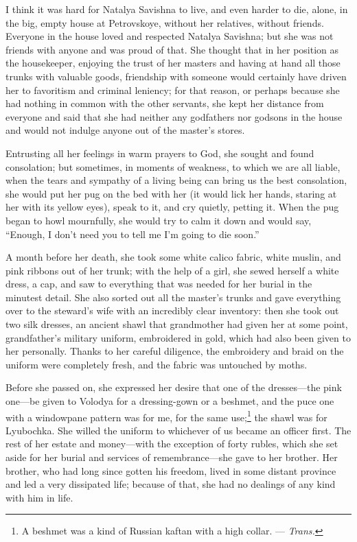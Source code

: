 I think it was hard for Natalya Savishna to live, and even harder to die, alone, in the big, empty house at Petrovskoye, without her relatives, without friends. Everyone in the house loved and respected Natalya Savishna; but she was not friends with anyone and was proud of that. She thought that in her position as the housekeeper, enjoying the trust of her masters and having at hand all those trunks with valuable goods, friendship with someone would certainly have driven her to favoritism and criminal leniency; for that reason, or perhaps because she had nothing in common with the other servants, she kept her distance from everyone and said that she had neither any godfathers nor godsons in the house and would not indulge anyone out of the master's stores.

Entrusting all her feelings in warm prayers to God, she sought and found consolation; but sometimes, in moments of weakness, to which we are all liable, when the tears and sympathy of a living being can bring us the best consolation, she would put her pug on the bed with her (it would lick her hands, staring at her with its yellow eyes), speak to it, and cry quietly, petting it. When the pug began to howl mournfully, she would try to calm it down and would say, ``Enough, I don't need you to tell me I'm going to die soon.'' %

A month before her death, she took some white calico fabric, white muslin, and pink ribbons out of her trunk; with the help of a girl, she sewed herself a white dress, a cap, and saw to everything that was needed for her burial in the minutest detail. She also sorted out all the master's trunks and gave everything over to the steward's wife with an incredibly clear inventory: then she took out two silk dresses, an ancient shawl that grandmother had given her at some point, grandfather's military uniform, embroidered in gold, which had also been given to her personally. Thanks to her careful diligence, the embroidery and braid on the uniform were completely fresh, and the fabric was untouched by moths.

Before she passed on, she expressed her desire that one of the dresses---the pink one---be given to Volodya for a dressing-gown or a beshmet, and the puce one with a windowpane pattern was for me, for the same use;\footnote{A beshmet was a kind of Russian kaftan with a high collar. --- \textit{Trans.}} the shawl was for Lyubochka. She willed the uniform to whichever of us became an officer first. The rest of her estate and money---with the exception of forty rubles, which she set aside for her burial and services of remembrance---she gave to her brother. Her brother, who had long since gotten his freedom, lived in some distant province and led a very dissipated life; because of that, she had no dealings of any kind with him in life. 


